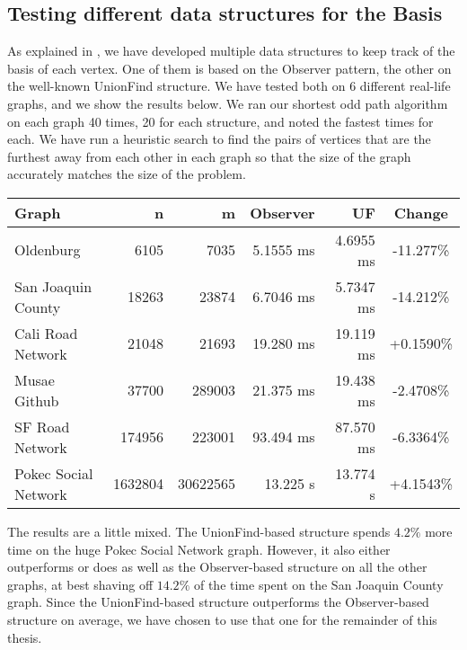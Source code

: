 \subsection{Testing different data structures for the Basis}
\label{subsubsection:testing-basis}
As explained in , we have developed multiple data structures to keep track of the basis of each vertex. One of them is based on the Observer pattern, the other on the well-known UnionFind structure. We have tested both on 6 different real-life graphs, and we show the results below. We ran our shortest odd path algorithm on each graph 40 times, 20 for each structure, and noted the fastest times for each. We have run a heuristic search to find the pairs of vertices that are the furthest away from each other in each graph so that the size of the graph accurately matches the size of the problem.
\begin{center}
    \begin{tabular}{|l | r | r | r | r | c|} 
     \hline
     Graph & n & m & Observer & UF & Change \\ [0.5ex] 
     \hline\hline
     Oldenburg & 6105 & 7035 & 5.1555 ms & 4.6955 ms & -11.277\%\\ 
     \hline
     San Joaquin County & 18263 & 23874 & 6.7046 ms & 5.7347 ms & -14.212\%\\
     \hline
     Cali Road Network & 21048 & 21693 & 19.280 ms & 19.119 ms & +0.1590\%\\
     \hline
     Musae Github \cite{graph:musae-github} & 37700 & 289003 & 21.375 ms & 19.438 ms & -2.4708\%\\
     \hline
     SF Road Network & 174956 & 223001 & 93.494 ms & 87.570 ms & -6.3364\%\\ [1ex] 
     \hline
     Pokec Social Network \cite{graph:soc-pokec} & 1632804 & 30622565 & 13.225 s & 13.774 s & +4.1543\%\\ [1ex] 
     \hline
    \end{tabular}
\end{center}


The results are a little mixed. The UnionFind-based structure spends $4.2\%$ more time on the huge Pokec Social Network graph. However, it also either outperforms or does as well as the Observer-based structure on all the other graphs, at best shaving off $14.2\%$ of the time spent on the San Joaquin County graph. Since the UnionFind-based structure outperforms the Observer-based structure on average, we have chosen to use that one for the remainder of this thesis.

